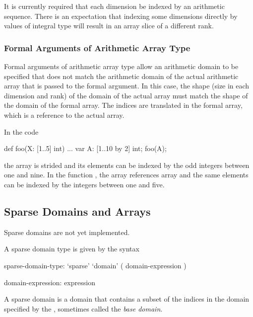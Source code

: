 \begin{implementation}
It is currently required that each dimension be indexed by an
arithmetic sequence.  There is an expectation that indexing some
dimensions directly by values of integral type will result in an array
slice of a different rank.
\end{implementation}

\subsubsection{Formal Arguments of Arithmetic Array Type}
\label{Formal_Arguments_of_Arithmetic_Array_Type}

Formal arguments of arithmetic array type allow an arithmetic domain
to be specified that does not match the arithmetic domain of the
actual arithmetic array that is passed to the formal argument.  In
this case, the shape (size in each dimension and rank) of the domain
of the actual array must match the shape of the domain of the formal
array.  The indices are translated in the formal array, which is a
reference to the actual array.

\begin{example}
In the code
\begin{chapel}
def foo(X: [1..5] int) { ... }
var A: [1..10 by 2] int;
foo(A);
\end{chapel}
the array  is strided and its elements can be indexed by the
odd integers between one and nine.  In the function , the
array  references array  and the same elements can be
indexed by the integers between one and five.
\end{example}

\subsection{Sparse Domains and Arrays}
\label{Sparse_Domains_and_Arrays}

\begin{implementation}
Sparse domains are not yet implemented.
\end{implementation}

A sparse domain type is given by the syntax
\begin{syntax}
sparse-domain-type:
  `sparse' `domain' ( domain-expression )

domain-expression:
  expression
\end{syntax}
A sparse domain is a domain that contains a subset of the indices in
the domain specified by the , sometimes called
the {\em base domain}.

